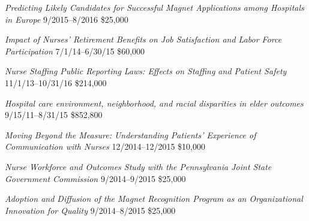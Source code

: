 \documentclass[10pt,]{article}
\begin{document}
{{{{{{{{{{{{{{\textit {Predicting Likely Candidates for Successful Magnet Applications among Hospitals in Europe} \hfill  9/2015--8/2016 \newline
{} \hfill \$25,000

\textit {Impact of Nurses’ Retirement Benefits on Job Satisfaction and Labor Force Participation} \hfill 7/1/14--6/30/15 \newline
{}\hfill \$60,000

\textit {Nurse Staffing Public Reporting Laws: Effects on Staffing and Patient Safety} \hfill 11/1/13--10/31/16 \newline
{}	\hfill \$214,000

\textit {Hospital care environment, neighborhood, and racial disparities in elder outcomes} \hfill 9/15/11--8/31/15 \newline
{}	\hfill \$852,800

\textit {Moving Beyond the Measure: Understanding Patients' Experience of Communication with Nurses} \hfill 12/2014--12/2015 \newline
{}	\hfill \$10,000

\textit {Nurse Workforce and Outcomes Study with the Pennsylvania Joint State Government Commission} \hfill 9/2014--9/2015 \newline
{}	\hfill \$25,000

\textit {Adoption and Diffusion of the  Magnet Recognition Program as an Organizational Innovation for Quality} \hfill 9/2014--8/2015 \newline
{}	\hfill \$25,000

}}}}}}}}}}}}}}
\end{document}
